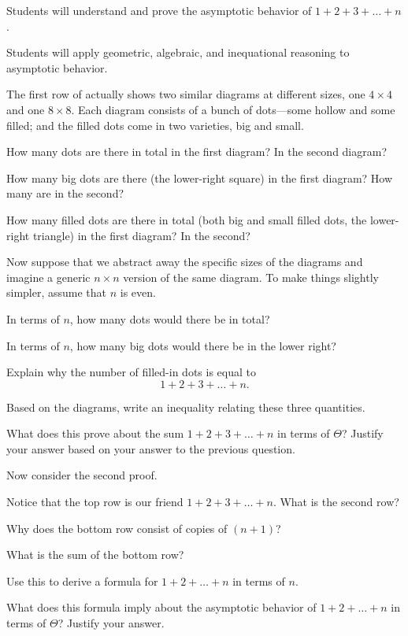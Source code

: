 \documentclass{tufte-handout}
\begin{document}
\begin{objective}
  Students will understand and prove the asymptotic behavior of $1 + 2
  + 3 + \dots + n$.
\end{objective}

\begin{objective}
  Students will apply geometric, algebraic, and inequational reasoning
  to asymptotic behavior.
\end{objective}

The first row of  actually shows two similar
diagrams at different sizes, one $4 \times 4$ and one $8 \times 8$.
Each diagram consists of a bunch of dots---some hollow and some filled;
and the filled dots come in two varieties, big and small.
\begin{questions}
  \item How many dots are there in total in the first diagram?  In the
    second diagram?
  \item How many big dots are there (\ie the lower-right square) in the
    first diagram?  How many are in the second?
  \item How many filled dots are there in total (both big and small
    filled dots, \ie the lower-right triangle) in the first diagram?
    In the second?
\end{questions}
Now suppose that we abstract away the specific sizes of the diagrams
and imagine a generic $n \times n$ version of the same diagram.  To
make things slightly simpler, assume that $n$ is even.
\begin{questions}
\item In terms of $n$, how many dots would there be in total?
\item In terms of $n$, how many big dots would there be in the lower right?
\item Explain why the number of filled-in dots is equal to \[ 1 + 2 + 3
  + \dots + n. \]
\item Based on the diagrams, write an inequality relating these three
  quantities.
  \newpage
\item What does this prove about the sum $1 + 2 + 3 + \dots + n$ in
  terms of $\Theta$?  Justify your answer based on your answer to the
  previous question.
\end{questions}
Now consider the second proof.
\begin{questions}
\item Notice that the top row is our friend $1 + 2 + 3 + \dots + n$.
  What is the second row?
\item Why does the bottom row consist of copies of $(n+1)$?
\item What is the sum of the bottom row?
\item Use this to derive a formula for $1 + 2 + \dots + n$ in
  terms of $n$.
\item What does this formula imply about the asymptotic behavior of
  $1 + 2 + \dots + n$ in terms of $\Theta$?  Justify your answer.
\end{questions}
\end{document}
